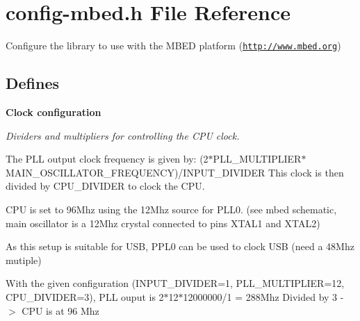 \hypertarget{config-mbed_8h}{\section{config-\/mbed.h File Reference}
\label{config-mbed_8h}
}


Configure the library to use with the M\-B\-E\-D platform (\href{http://www.mbed.org}{\tt http\-://www.\-mbed.\-org})  


\subsection*{Defines}
\begin{Indent}{\bf Clock configuration}\par
{\em Dividers and multipliers for controlling the C\-P\-U clock.

The P\-L\-L output clock frequency is given by\-: (2$\ast$\-P\-L\-L\-\_\-\-M\-U\-L\-T\-I\-P\-L\-I\-E\-R$\ast$\-M\-A\-I\-N\-\_\-\-O\-S\-C\-I\-L\-L\-A\-T\-O\-R\-\_\-\-F\-R\-E\-Q\-U\-E\-N\-C\-Y)/\-I\-N\-P\-U\-T\-\_\-\-D\-I\-V\-I\-D\-E\-R This clock is then divided by C\-P\-U\-\_\-\-D\-I\-V\-I\-D\-E\-R to clock the C\-P\-U.

C\-P\-U is set to 96\-Mhz using the 12\-Mhz source for P\-L\-L0. (see mbed schematic, main oscillator is a 12\-Mhz crystal connected to pins X\-T\-A\-L1 and X\-T\-A\-L2)

As this setup is suitable for U\-S\-B, P\-P\-L0 can be used to clock U\-S\-B (need a 48\-Mhz mutiple)

With the given configuration (I\-N\-P\-U\-T\-\_\-\-D\-I\-V\-I\-D\-E\-R=1, P\-L\-L\-\_\-\-M\-U\-L\-T\-I\-P\-L\-I\-E\-R=12, C\-P\-U\-\_\-\-D\-I\-V\-I\-D\-E\-R=3), P\-L\-L ouput is 2$\ast$12$\ast$12000000/1 = 288\-Mhz Divided by 3 -\/$>$ C\-P\-U is at 96 Mhz

}
\end{Indent}
